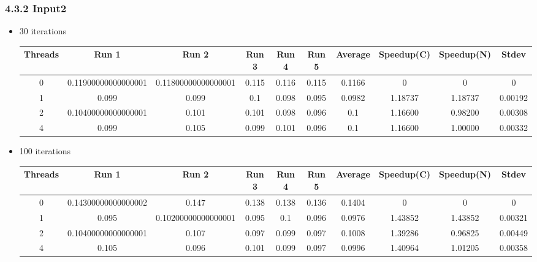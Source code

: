 \subsubsection*{4.3.2 Input2} 
 \begin{itemize}
\item 30 iterations
\begin{center}
 \begin{adjustbox}{width=\columnwidth, center} 
 \begin{tabular}{ | |c | c c c c c | c | c c | c | |} \hline 
 Threads & Run 1 & Run 2 & Run 3 & Run 4 & Run 5 & Average & Speedup(C) & Speedup(N) & Stdev \\ [0.5ex] 
 \hline 
 \hline 
0& 0.11900000000000001 & 0.11800000000000001 & 0.115 & 0.116 & 0.115 & 0.1166 & 0 & 0 & 0\\ 
 \hline
1& 0.099 & 0.099 & 0.1 & 0.098 & 0.095 & 0.0982 & 1.18737 & 1.18737 & 0.00192\\ 
 \hline
2& 0.10400000000000001 & 0.101 & 0.101 & 0.098 & 0.096 & 0.1 & 1.16600 & 0.98200 & 0.00308\\ 
 \hline
4& 0.099 & 0.105 & 0.099 & 0.101 & 0.096 & 0.1 & 1.16600 & 1.00000 & 0.00332\\ 
 \hline
\end{tabular} 
 \end{adjustbox} 
 \end{center} 
\item 100 iterations
\begin{center}
 \begin{adjustbox}{width=\columnwidth, center} 
 \begin{tabular}{ | |c | c c c c c | c | c c | c | |} \hline 
 Threads & Run 1 & Run 2 & Run 3 & Run 4 & Run 5 & Average & Speedup(C) & Speedup(N) & Stdev \\ [0.5ex] 
 \hline 
 \hline 
0& 0.14300000000000002 & 0.147 & 0.138 & 0.138 & 0.136 & 0.1404 & 0 & 0 & 0\\ 
 \hline
1& 0.095 & 0.10200000000000001 & 0.095 & 0.1 & 0.096 & 0.0976 & 1.43852 & 1.43852 & 0.00321\\ 
 \hline
2& 0.10400000000000001 & 0.107 & 0.097 & 0.099 & 0.097 & 0.1008 & 1.39286 & 0.96825 & 0.00449\\ 
 \hline
4& 0.105 & 0.096 & 0.101 & 0.099 & 0.097 & 0.0996 & 1.40964 & 1.01205 & 0.00358\\ 
 \hline
\end{tabular} 
 \end{adjustbox} 
 \end{center} 

\end{itemize}
